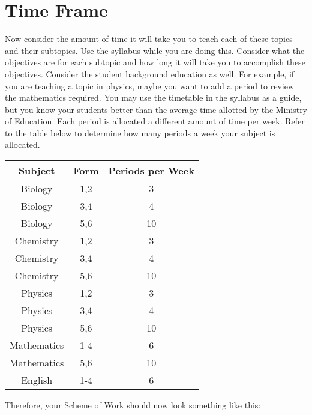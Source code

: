 \section{Time Frame}
Now consider the amount of time it will take you to teach each of these topics and their subtopics. Use the syllabus while you are doing this.  Consider what the objectives are for each subtopic and how long it will take you to accomplish these objectives.  Consider the student background education as well.  For example, if you are teaching a topic in physics, maybe you want to add a period to review the mathematics required.  You may use the timetable in the syllabus as a guide, but you know your students better than the average time allotted by the Ministry of Education.  Each period is allocated a different amount of time per week.  Refer to the table below to determine how many periods a week your subject is allocated.\\

\begin{center}

\begin{tabular}{|c|c|c|}
\hline \rule[-2ex]{0pt}{5.5ex} Subject & Form & Periods per Week \\ 
\hline \rule[-2ex]{0pt}{5.5ex} Biology & 1,2 & 3 \\ 
\hline \rule[-2ex]{0pt}{5.5ex} Biology & 3,4 & 4 \\ 
\hline \rule[-2ex]{0pt}{5.5ex} Biology & 5,6 & 10 \\ 
\hline \rule[-2ex]{0pt}{5.5ex} Chemistry & 1,2 & 3 \\ 
\hline \rule[-2ex]{0pt}{5.5ex} Chemistry & 3,4  & 4 \\ 
\hline \rule[-2ex]{0pt}{5.5ex} Chemistry & 5,6 & 10 \\ 
\hline \rule[-2ex]{0pt}{5.5ex} Physics & 1,2 & 3 \\ 
\hline \rule[-2ex]{0pt}{5.5ex} Physics & 3,4 & 4 \\ 
\hline \rule[-2ex]{0pt}{5.5ex} Physics & 5,6 & 10 \\ 
\hline \rule[-2ex]{0pt}{5.5ex} Mathematics & 1-4 & 6 \\ 
\hline \rule[-2ex]{0pt}{5.5ex} Mathematics & 5,6  & 10 \\ 
\hline \rule[-2ex]{0pt}{5.5ex} English & 1-4 & 6 \\ 
\hline 
\end{tabular} 

\end{center}
Therefore, your Scheme of Work should now look something like this:

